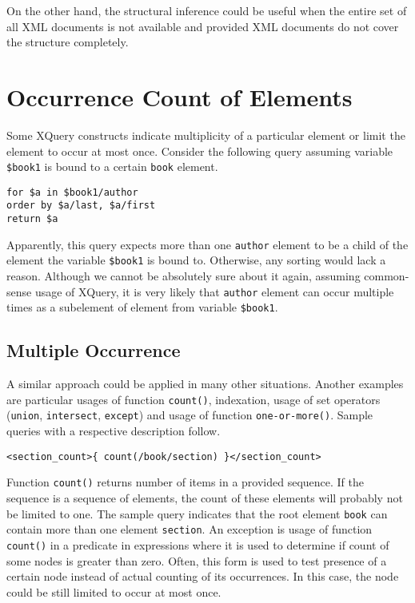 On the other hand, the structural inference could be useful when the entire set of all XML documents is not available and provided XML documents do not cover the structure completely.

\section{Occurrence Count of Elements}
Some XQuery constructs indicate multiplicity of a particular element or limit the element to occur at most once. Consider the following query assuming variable \texttt{\$book1} is bound to a certain \texttt{book} element.

\begin{verbatim}
for $a in $book1/author 
order by $a/last, $a/first
return $a
\end{verbatim}

Apparently, this query expects more than one \texttt{author} element to be a child of the element the variable \texttt{\$book1} is bound to. Otherwise, any sorting would lack a reason. Although we cannot be absolutely sure about it again, assuming common-sense usage of XQuery, it is very likely that \texttt{author} element can occur multiple times as a subelement of element from variable \texttt{\$book1}.

\subsection{Multiple Occurrence}
A similar approach could be applied in many other situations. Another examples are particular usages of function \texttt{count()}, indexation, usage of set operators (\texttt{union}, \texttt{intersect}, \texttt{except}) and usage of function \texttt{one-or-more()}. Sample queries with a respective description follow.

\begin{verbatim}
<section_count>{ count(/book/section) }</section_count>
\end{verbatim}

Function \texttt{count()} returns number of items in a provided sequence. If the sequence is a sequence of elements, the count of these elements will probably not be limited to one. The sample query indicates that the root element \texttt{book} can contain more than one element \texttt{section}.
An exception is usage of function \texttt{count()} in a predicate in expressions where it is used to determine if count of some nodes is greater than zero. Often, this form is used to test presence of a certain node instead of actual counting of its occurrences. In this case, the node could be still limited to occur at most once.


